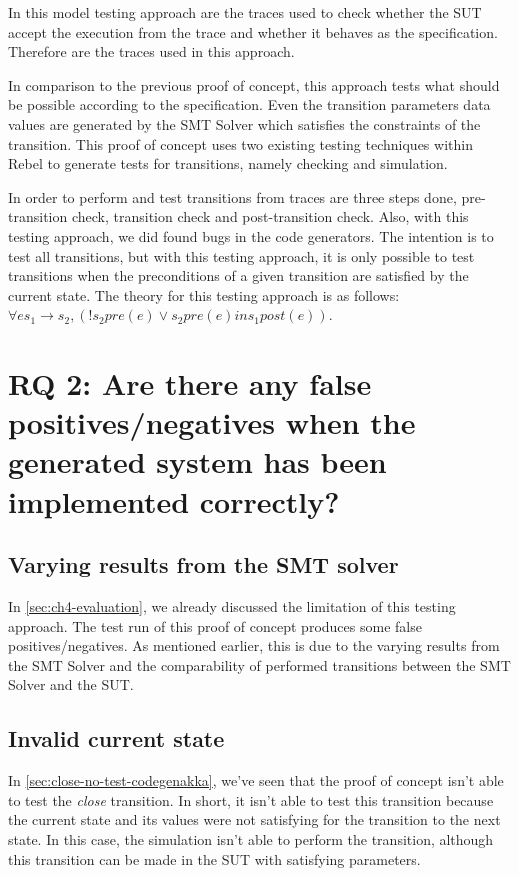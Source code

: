 In this model testing approach are the traces used to check whether the SUT accept the execution from the trace and whether it behaves as the specification. Therefore are the traces used in this approach.

In comparison to the previous proof of concept, this approach tests what should be possible according to the specification. Even the transition parameters data values are generated by the SMT Solver which satisfies the constraints of the transition. This proof of concept uses two existing testing techniques within Rebel to generate tests for transitions, namely checking and simulation.

In order to perform and test transitions from traces are three steps done, pre-transition check, transition check and post-transition check. Also, with this testing approach, we did found bugs in the code generators. The intention is to test all transitions, but with this testing approach, it is only possible to test transitions when the preconditions of a given transition are satisfied by the current state. The theory for this testing approach is as follows: $\forall e s_{1} \to s_{2}, (! s_{2} pre(e) \lor s_{2} pre(e) in s_{1} post(e))$.

\section{RQ 2: Are there any false positives/negatives when the generated system has been implemented correctly?}

\subsection{Varying results from the SMT solver}
In \autoref{sec:ch4-evaluation}, we already discussed the limitation of this testing approach. The test run of this proof of concept produces some false positives/negatives. As mentioned earlier, this is due to the varying results from the SMT Solver and the comparability of performed transitions between the SMT Solver and the SUT.


\subsection{Invalid current state}
In \autoref{sec:close-no-test-codegenakka}, we've seen that the proof of concept isn't able to test the \textit{close} transition. In short, it isn't able to test this transition because the current state and its values were not satisfying for the transition to the next state. In this case, the simulation isn't able to perform the transition, although this transition can be made in the SUT with satisfying parameters.

